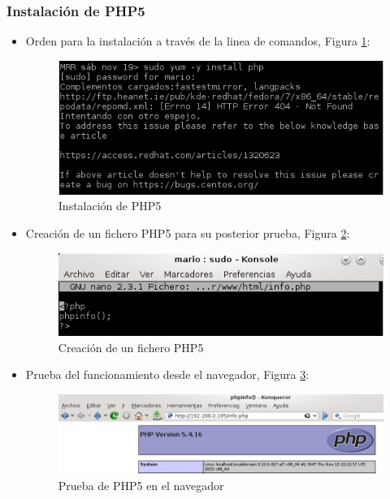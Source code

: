 \subsubsection{Instalación de PHP5}
	\begin{itemize}
		\item Orden para la instalación a través de la linea de comandos, Figura \ref{fig:figura33}:
		\begin{figure}[H] %
			\centering
			\includegraphics[scale=0.6]{figuras/figura33.png} 
			\caption{Instalación de PHP5} 
			\label{fig:figura33}
		\end{figure}
		
		\item Creación de un fichero PHP5 para su posterior prueba, Figura \ref{fig:figura34}:
		\begin{figure}[H] %
			\centering
			\includegraphics[scale=0.6]{figuras/figura34.png} 
			\caption{Creación de un fichero PHP5} 
			\label{fig:figura34}
		\end{figure}
	
		\item Prueba del funcionamiento desde el navegador, Figura \ref{fig:figura35}:
		\begin{figure}[H] %
			\centering
			\includegraphics[scale=0.6]{figuras/figura35.png} 
			\caption{Prueba de PHP5 en el navegador} 
			\label{fig:figura35}
		\end{figure}
	\end{itemize}
	

